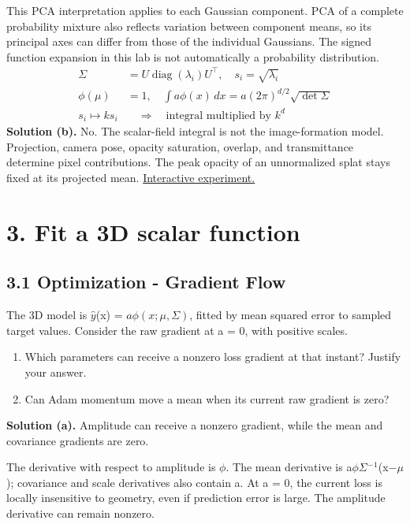\documentclass[11pt,a4paper]{article}
\begin{document}
This PCA interpretation applies to each Gaussian component.
PCA of a complete probability mixture also reflects variation between component means, so its principal axes can differ from those of the individual Gaussians.
The signed function expansion in this lab is not automatically a probability distribution.
\[
\begin{aligned}\Sigma&=U\operatorname{diag}(\lambda_i)U^\top,\quad s_i=\sqrt{\lambda_i}\\\phi(\mu)&=1,\quad\int a\phi(x)\,dx=a(2\pi)^{d/2}\sqrt{\det\Sigma}\\s_i\mapsto ks_i&\quad\Longrightarrow\quad\text{integral multiplied by }k^d\end{aligned}
\]
\noindent\textbf{Solution (b).} No.
The scalar-field integral is not the image-formation model.
Projection, camera pose, opacity saturation, overlap, and transmittance determine pixel contributions.
The peak opacity of an unnormalized splat stays fixed at its projected mean.
\noindent\href{https://sosekie.github.io/Unibe-CVG-CV-Interactive-Labs/tutorial-09/#dimensions}{Interactive experiment.}
\par{}\section*{3. Fit a 3D scalar function}
\subsection*{3.1 Optimization - Gradient Flow}
The 3D model is $\hat{y}$(x) = $a\phi(x;\mu,\Sigma)$, fitted by mean squared error to sampled target values.
Consider the raw gradient at a = 0, with positive scales.
\begin{enumerate}[label=(\alph*),nosep]
\item Which parameters can receive a nonzero loss gradient at that instant?
Justify your answer.
\item Can Adam momentum move a mean when its current raw gradient is zero?
\end{enumerate}
\noindent\textbf{Solution (a).} Amplitude can receive a nonzero gradient, while the mean and covariance gradients are zero.

The derivative with respect to amplitude is $\phi$.
The mean derivative is a$\phi$$\Sigma$${}^{-}$${}^1$(x$-$$\mu$); covariance and scale derivatives also contain a.
At a = 0, the current loss is locally insensitive to geometry, even if prediction error is large.
The amplitude derivative can remain nonzero.
\end{document}
